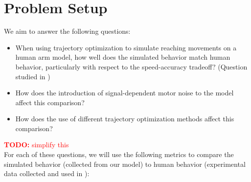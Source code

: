 \documentclass[letterpaper, 10pt, conference]{ieeeconf}
\newcommand{\todo}[1]{\textcolor{red}{\textbf{TODO:} #1}}
\begin{document}
\section{Problem Setup}
We aim to answer the following questions: 
\begin{itemize}
    \item When using trajectory optimization to simulate reaching movements on a human arm model, how well does the simulated behavior match human behavior, particularly with respect to the speed-accuracy tradeoff? (Question studied in \cite{original_paper_high_fidelity})

    \item How does the introduction of signal-dependent motor noise to the model affect this comparison?

    \item How does the use of different trajectory optimization methods affect this comparison?
\end{itemize}
\todo{simplify this} \\
For each of these questions, we will use the following metrics to compare the simulated behavior (collected from our model) to human behavior (experimental data collected and used in \cite{original_paper_high_fidelity}):
\end{document}
